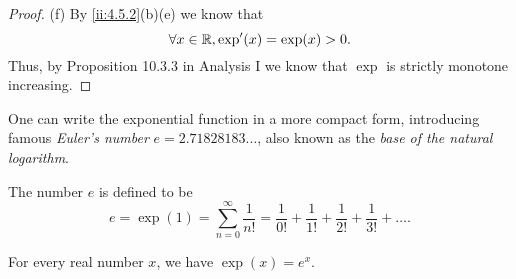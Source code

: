 \begin{proof}{(f)}
  By \cref{ii:4.5.2}(b)(e) we know that
  \[
    \forall x \in \mathbb{R}, \exp'(x) = \exp(x) > 0.
  \]
  Thus, by Proposition 10.3.3 in Analysis I we know that \(\exp\) is strictly monotone increasing.
\end{proof}

\begin{note}
  One can write the exponential function in a more compact form, introducing famous \emph{Euler's number} \(e = 2.71828183 \dots\), also known as the \emph{base of the natural logarithm}.
\end{note}

\begin{defn}\label{ii:4.5.3}
  The number \(e\) is defined to be
  \[
    e = \exp(1) = \sum_{n = 0}^\infty \dfrac{1}{n!} = \dfrac{1}{0!} + \dfrac{1}{1!} + \dfrac{1}{2!} + \dfrac{1}{3!} + \dots.
  \]
\end{defn}

\begin{prop}\label{ii:4.5.4}
  For every real number \(x\), we have \(\exp(x) = e^x\).
\end{prop}

